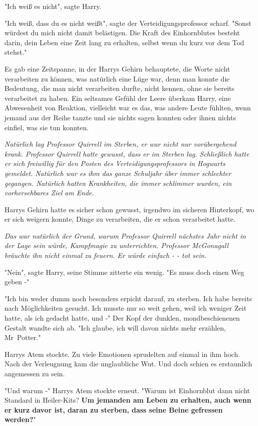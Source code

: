 {"Ich weiß es nicht", sagte Harry.

"Ich weiß, dass du es nicht weißt", sagte der Verteidigungsprofessor scharf. "Sonst würdest du mich nicht damit belästigen. Die Kraft des Einhornblutes besteht darin, dein Leben eine Zeit lang zu erhalten, selbst wenn du kurz vor dem Tod stehst."

Es gab eine Zeitspanne, in der Harrys Gehirn behauptete, die Worte nicht verarbeiten zu können, was natürlich eine Lüge war, denn man konnte die Bedeutung, die man nicht verarbeiten durfte, nicht kennen, ohne sie bereits verarbeitet zu haben. Ein seltsames Gefühl der Leere überkam Harry, eine Abwesenheit von Reaktion, vielleicht war es das, was andere Leute fühlten, wenn jemand aus der Reihe tanzte und sie nichts sagen konnten oder ihnen nichts einfiel, was sie tun konnten.

\emph{Natürlich lag Professor Quirrell im Sterben, er war nicht nur vorübergehend krank. Professor Quirrell hatte gewusst, dass er im Sterben lag. Schließlich hatte er sich freiwillig für den Posten des Verteidigungsprofessors in Hogwarts gemeldet. Natürlich war es ihm das ganze Schuljahr über immer schlechter gegangen. Natürlich hatten Krankheiten, die immer schlimmer wurden, ein vorhersehbares Ziel am Ende.}

Harrys Gehirn hatte es sicher schon gewusst, irgendwo im sicheren Hinterkopf, wo er sich weigern konnte, Dinge zu verarbeiten, die er schon verarbeitet hatte.

\emph{Das war natürlich der Grund, warum Professor Quirrell nächstes Jahr nicht in der Lage sein würde, Kampfmagie zu unterrichten. Professor McGonagall bräuchte ihn nicht einmal zu feuern. Er würde einfach - - tot sein.}

"Nein", sagte Harry, seine Stimme zitterte ein wenig. "Es muss doch einen Weg geben -"

"Ich bin weder dumm noch besonders erpicht darauf, zu sterben. Ich habe bereits nach Möglichkeiten gesucht. Ich musste nur so weit gehen, weil ich weniger Zeit hatte, als ich gedacht hatte, und -" Der Kopf der dunklen, mondbeschienenen Gestalt wandte sich ab. "Ich glaube, ich will davon nichts mehr erzählen, Mr~Potter."

Harrys Atem stockte. Zu viele Emotionen sprudelten auf einmal in ihm hoch. Nach der Verleugnung kam die unglaubliche Wut. Und doch schien es erstaunlich angemessen zu sein.

"Und warum -" Harrys Atem stockte erneut. "Warum ist Einhornblut dann nicht Standard in Heiler-Kits? \textbf{Um jemanden am Leben zu erhalten, auch wenn er kurz davor ist, daran zu sterben, dass seine Beine gefressen werden?}"

}
